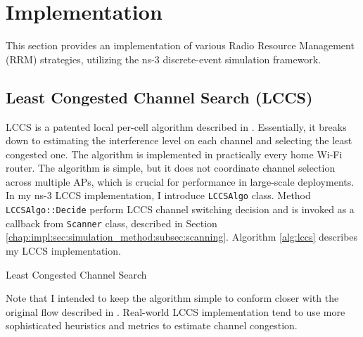 \section{Implementation}
\label{chap:impl:sec:implementation}
This section provides an implementation of various Radio Resource Management (RRM) strategies, utilizing the ns-3 discrete-event simulation framework.

\subsection{Least Congested Channel Search (LCCS)}
\label{chap:impl:sec:implementation:lccs}
LCCS is a patented local per-cell algorithm described in \cite{achantaMethodApparatusLeast2006}. Essentially, it breaks down to estimating the interference level on each channel and selecting the least congested one. The algorithm is implemented in practically every home Wi-Fi router. The algorithm is simple, but it does not coordinate channel selection across multiple APs, which is crucial for performance in large-scale deployments.
In my ns-3 LCCS implementation, I introduce \texttt{LCCSAlgo} class. Method \texttt{LCCSAlgo::Decide} perform LCCS channel switching decision and is invoked as a callback from \texttt{Scanner} class, described in Section \ref{chap:impl:sec:simulation_method:subsec:scanning}.
Algorithm \ref{alg:lccs} describes my LCCS implementation.

\begin{algorithm}[H]
\label{alg:lccs}
\caption{Least Congested Channel Search}
\DontPrintSemicolon
\SetAlgoLined
{}

\end{algorithm}

Note that I intended to keep the algorithm simple to conform closer with the original flow described in \cite{achantaMethodApparatusLeast2006}. Real-world LCCS implementation tend to use more sophisticated heuristics and metrics to estimate channel congestion.

